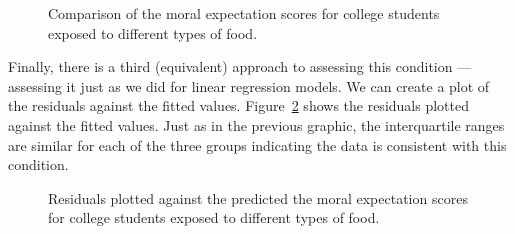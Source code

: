 \documentclass[
  letterpaper,
  DIV=11,
  numbers=noendperiod]{scrreprt}
\theoremstyle{definition}
\theoremstyle{definition}
\theoremstyle{plain}
\theoremstyle{remark}
\begin{document}
\begin{figure}


\caption{\label{fig-anovaassessment-variance-organic-alt}Comparison of
the moral expectation scores for college students exposed to different
types of food.}

\end{figure}%

Finally, there is a third (equivalent) approach to assessing this
condition --- assessing it just as we did for linear regression models.
We can create a plot of the residuals against the fitted values.
Figure~\ref{fig-anovaassessment-variance-organic-alt2} shows the
residuals plotted against the fitted values. Just as in the previous
graphic, the interquartile ranges are similar for each of the three
groups indicating the data is consistent with this condition.

\begin{figure}


\caption{\label{fig-anovaassessment-variance-organic-alt2}Residuals
plotted against the predicted the moral expectation scores for college
students exposed to different types of food.}

\end{figure}%
\end{document}
